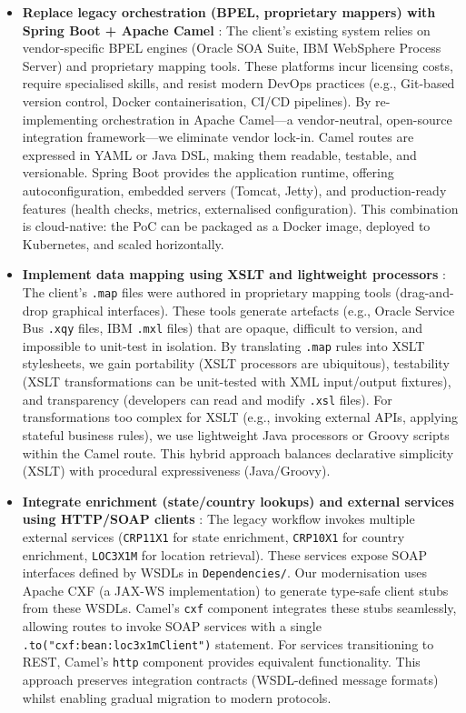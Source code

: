 \documentclass[11pt]{article}
\begin{document}
\begin{itemize}
  \item \textbf{Replace legacy orchestration (BPEL, proprietary mappers) with Spring Boot + Apache Camel} \cite{camel-docs}: The client's existing system relies on vendor-specific BPEL engines (Oracle SOA Suite, IBM WebSphere Process Server) and proprietary mapping tools. These platforms incur licensing costs, require specialised skills, and resist modern DevOps practices (e.g., Git-based version control, Docker containerisation, CI/CD pipelines). By re-implementing orchestration in Apache Camel—a vendor-neutral, open-source integration framework—we eliminate vendor lock-in. Camel routes are expressed in YAML or Java DSL, making them readable, testable, and versionable. Spring Boot provides the application runtime, offering autoconfiguration, embedded servers (Tomcat, Jetty), and production-ready features (health checks, metrics, externalised configuration). This combination is cloud-native: the PoC can be packaged as a Docker image, deployed to Kubernetes, and scaled horizontally.

  \item \textbf{Implement data mapping using XSLT and lightweight processors} \cite{xslt-spec}: The client's \texttt{.map} files were authored in proprietary mapping tools (drag-and-drop graphical interfaces). These tools generate artefacts (e.g., Oracle Service Bus \texttt{.xqy} files, IBM \texttt{.mxl} files) that are opaque, difficult to version, and impossible to unit-test in isolation. By translating \texttt{.map} rules into XSLT stylesheets, we gain portability (XSLT processors are ubiquitous), testability (XSLT transformations can be unit-tested with XML input/output fixtures), and transparency (developers can read and modify \texttt{.xsl} files). For transformations too complex for XSLT (e.g., invoking external APIs, applying stateful business rules), we use lightweight Java processors or Groovy scripts within the Camel route. This hybrid approach balances declarative simplicity (XSLT) with procedural expressiveness (Java/Groovy).

  \item \textbf{Integrate enrichment (state/country lookups) and external services using HTTP/SOAP clients} \cite{soap-spec, wsdl-spec}: The legacy workflow invokes multiple external services (\texttt{CRP11X1} for state enrichment, \texttt{CRP10X1} for country enrichment, \texttt{LOC3X1M} for location retrieval). These services expose SOAP interfaces defined by WSDLs in \texttt{Dependencies/}. Our modernisation uses Apache CXF (a JAX-WS implementation) to generate type-safe client stubs from these WSDLs. Camel's \texttt{cxf} component integrates these stubs seamlessly, allowing routes to invoke SOAP services with a single \texttt{.to("cxf:bean:loc3x1mClient")} statement. For services transitioning to REST, Camel's \texttt{http} component provides equivalent functionality. This approach preserves integration contracts (WSDL-defined message formats) whilst enabling gradual migration to modern protocols.


\end{itemize}
\end{document}
